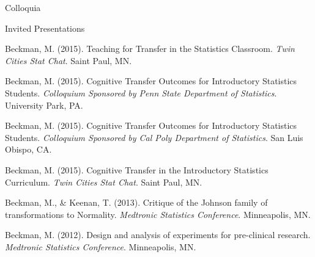 \documentclass{resume} %
\begin{document}

\begin{rSection}{Colloquia}
	

	\begin{rSubsection}{Invited Presentations}{}{}{}
		

		\item[] Beckman, M. (2015). Teaching for Transfer in the Statistics Classroom. \textit{Twin Cities Stat Chat}. Saint Paul, MN. \vspace{0.5em}

		\item[] Beckman, M. (2015). Cognitive Transfer Outcomes for Introductory Statistics Students. \textit{Colloquium Sponsored by Penn State Department of Statistics}. University Park, PA. \vspace{0.5em}
		
		\item[] Beckman, M. (2015). Cognitive Transfer Outcomes for Introductory Statistics Students. \textit{Colloquium Sponsored by Cal Poly Department of Statistics}. San Luis Obispo, CA. \vspace{0.5em}		
		
		\item[] Beckman, M. (2015). Cognitive Transfer in the Introductory Statistics Curriculum. \textit{Twin Cities Stat Chat}. Saint Paul, MN. \vspace{0.5em}	

		\item[] Beckman, M., \& Keenan, T. (2013). Critique of the Johnson family of transformations to Normality. \textit{Medtronic Statistics Conference}. Minneapolis, MN. \vspace{0.5em}
	
		\item[] Beckman, M. (2012). Design and analysis of experiments for pre-clinical research.  \textit{Medtronic Statistics Conference}. Minneapolis, MN. \vspace{0.5em}
		

\end{rSubsection}
\end{rSection}
\end{document}
